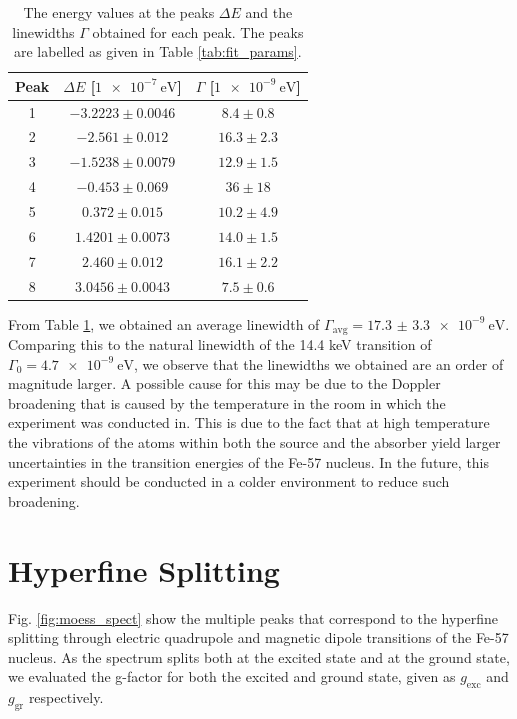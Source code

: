 \documentclass[a4paper]{report}
\numberwithin{equation}{section}
\begin{document}
\begin{table}[!ht]
    \centering
    \begin{tabular}{|c|c|c|}
    \hline  
        Peak & $\Delta E$ [$\SI{1e-7}{\electronvolt}$] & $\Gamma$ [$\SI{1e-9}{\electronvolt}$] \\ \hline
        1 &$-3.2223 \pm 0.0046$ & $8.4 \pm 0.8 $\\ \hline
        2 &$-2.561 \pm 0.012$ &   $16.3 \pm 2.3$ \\ \hline
        3 &$-1.5238 \pm 0.0079$ & $12.9 \pm 1.5$ \\ \hline
        4 &$-0.453 \pm 0.069$ &   $36 \pm 18 $ \\ \hline
        5 &$ 0.372 \pm 0.015$ &   $10.2 \pm 4.9$ \\ \hline
        6 &$ 1.4201 \pm 0.0073$ & $14.0 \pm 1.5$ \\ \hline
        7 &$ 2.460 \pm 0.012$ &   $16.1 \pm 2.2$ \\ \hline
        8 &$ 3.0456 \pm 0.0043$ & $7.5 \pm 0.6 $\\ \hline
    \end{tabular}
    \caption{The energy values at the peaks $\Delta E$ and the linewidths $\Gamma$ obtained for each peak. The peaks are 
    labelled as given in Table \ref{tab:fit_params}.}
\label{tab:energy_params}
\end{table}

From Table \ref{tab:energy_params}, we obtained an average linewidth of $\Gamma_{\mathrm{avg}} = \SI[{scientific-notation = true}]{17.3(33)e-9}{\electronvolt}$. 
Comparing this to the natural linewidth of the 14.4 keV transition of $\Gamma_0 = \SI{4.7e-9}{\electronvolt}$, we observe that the linewidths we obtained are an 
order of magnitude larger. A possible cause for this may be due to the Doppler broadening that is caused by the temperature in the room
in which the experiment was conducted in. This is due to the fact that at high temperature the vibrations of the atoms within both the source and 
the absorber yield larger uncertainties in the transition energies of the Fe-57 nucleus. In the future, this experiment should be 
conducted in a colder environment to reduce such broadening.\par 

\section{Hyperfine Splitting}

Fig. \ref{fig:moess_spect} show the multiple peaks that correspond to the hyperfine splitting through electric quadrupole and 
magnetic dipole transitions of the Fe-57 nucleus. As the spectrum splits both at the excited state and at the ground state, we evaluated
the g-factor for both the excited and ground state, given as $g_{\mathrm{exc}}$ and $g_{\mathrm{gr}}$ respectively. \par
\end{document}
